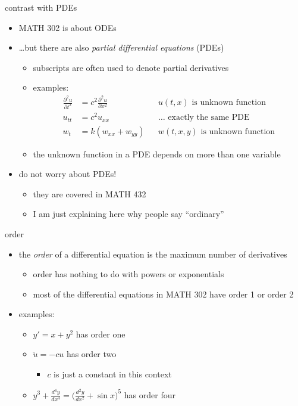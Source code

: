 \documentclass{beamer}
\begin{document}
\begin{frame}{contrast with PDEs}

\begin{itemize}
\item MATH 302 is about ODEs
\item \dots but there are also \emph{partial differential equations} (PDEs)
    \begin{itemize}
    \item subscripts are often used to denote partial derivatives
    \item examples:
\begin{align*}
\frac{\partial^2 u}{\partial t^2} &= c^2 \frac{\partial^2 u}{\partial x^2} && u(t,x) \text{ is unknown function} \\
u_{tt} &= c^2 u_{xx} && \dots \text{ exactly the same PDE} \\
w_t &= k(w_{xx} + w_{yy}) && w(t,x,y) \text{ is unknown function}
\end{align*}
    \item the unknown function in a PDE depends on more than one variable
    \end{itemize}
\item do not worry about PDEs!
    \begin{itemize}
    \item they are covered in MATH 432
    \item I am just explaining here why people say ``ordinary''
    \end{itemize}
\end{itemize}
\end{frame}

\begin{frame}{order}

\begin{itemize}
\item the \alert{\emph{order}} of a differential equation is the maximum number of derivatives
    \begin{itemize}
    \item order has nothing to do with powers or exponentials
    \item most of the differential equations in MATH 302 have order 1 or order 2
    \end{itemize}
\item examples:
    \begin{itemize}
    \item $y' = x + y^2$ has order one
    \item $\ddot u = - c u$ has order two
        \begin{itemize}
        \item $c$ is just a constant in this context
        \end{itemize}
    \item $y^3 + \frac{d^4 y}{dx^4} = \big(\frac{d^2 y}{dx^2} + \sin x\big)^5$ has order four
    \end{itemize}
\end{itemize}
\end{frame}
\end{document}
